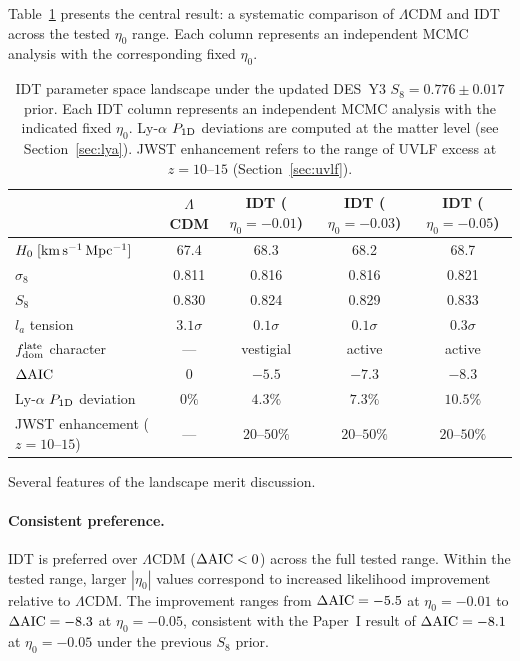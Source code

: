 \documentclass[aps,prd,twocolumn,superscriptaddress,nofootinbib]{revtex4-2}
\newcommand{\fdom}{f_{\rm dom}}
\newcommand{\dAIC}{\Delta{\rm AIC}}
\begin{document}
Table~\ref{tab:landscape} presents the central result: a systematic
comparison of $\Lambda$CDM and IDT across the tested $\eta_0$ range.
Each column represents an independent MCMC analysis with the
corresponding fixed $\eta_0$.

\begin{table}[t]
\centering
\caption{IDT parameter space landscape under the updated DES~Y3
$S_8 = 0.776 \pm 0.017$ prior. Each IDT column represents an
independent MCMC analysis with the indicated fixed $\eta_0$.
Ly-$\alpha$ $P_{1{\rm D}}$ deviations are computed at the matter
level (see Section~\ref{sec:lya}). JWST enhancement refers to the
range of UVLF excess at $z = 10$--$15$ (Section~\ref{sec:uvlf}).}
\label{tab:landscape}
\begin{tabular}{lcccc}
\hline\hline
 & $\Lambda$CDM & IDT ($\eta_0 = -0.01$) & IDT ($\eta_0 = -0.03$) & IDT ($\eta_0 = -0.05$) \\
\hline
$H_0\;[{\rm km\,s^{-1}\,Mpc^{-1}}]$ & 67.4 & 68.3 & 68.2 & 68.7 \\
$\sigma_8$ & 0.811 & 0.816 & 0.816 & 0.821 \\
$S_8$ & 0.830 & 0.824 & 0.829 & 0.833 \\
$l_a$ tension & $3.1\sigma$ & $0.1\sigma$ & $0.1\sigma$ & $0.3\sigma$ \\
$\fdom^{\rm late}$ character & --- & vestigial & active & active \\
$\dAIC$ & 0 & $-5.5$ & $-7.3$ & $-8.3$ \\
Ly-$\alpha$ $P_{1{\rm D}}$ deviation & $0\%$ & $4.3\%$ & $7.3\%$ & $10.5\%$ \\
JWST enhancement ($z = 10$--$15$) & --- & $20$--$50\%$ & $20$--$50\%$ & $20$--$50\%$ \\
\hline\hline
\end{tabular}
\end{table}

Several features of the landscape merit discussion.

\paragraph{Consistent preference.} IDT is preferred over $\Lambda$CDM
($\dAIC < 0$) across the full tested range. Within the tested range,
larger $|\eta_0|$ values correspond to increased likelihood
improvement relative to $\Lambda$CDM. The improvement ranges from
$\dAIC = -5.5$ at $\eta_0 = -0.01$ to $\dAIC = -8.3$ at
$\eta_0 = -0.05$, consistent with the Paper~I result of
$\dAIC = -8.1$ at $\eta_0 = -0.05$ under the previous $S_8$ prior.
\end{document}
